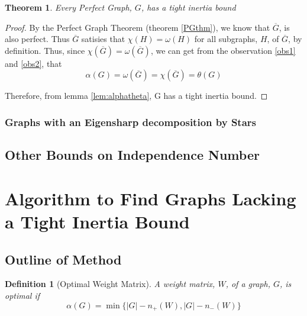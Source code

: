 \documentclass[12pt]{article}
\theoremstyle{parenbold}
\newtheorem{definition}{Definition}[section]
\newtheorem{theorem}{Theorem}[section]
\begin{document}
\begin{theorem}
Every Perfect Graph, $G$, has a tight inertia bound
\end{theorem}

\begin{proof}
By the Perfect Graph Theorem (theorem \ref{PGthm}), we know that $\overline{G}$, is also perfect. Thus $\overline{G}$ satisies that $\chi(H) = \omega(H)$ for all subgraphs, $H$, of $\overline{G}$, by definition.
Thus, since $\chi(\overline{G}) = \omega(\overline{G})$, we can get from the observation \ref{obs1} and \ref{obs2}, that
\begin{equation}
\alpha(G) = \omega(\overline{G}) = \chi(\overline{G}) = \theta(G)
\end{equation}

Therefore, from lemma \ref{lem:alphatheta}, G has a tight inertia bound.
\end{proof}

\subsubsection{Graphs with an Eigensharp decomposition by Stars}

\subsection{Other Bounds on Independence Number}

\section{Algorithm to Find Graphs Lacking a Tight Inertia Bound}

\subsection{Outline of Method}

\begin{definition}[Optimal Weight Matrix]
A weight matrix, $W$, of a graph, $G$, is optimal if
\begin{equation}
\alpha(G) = \min\{|G| - n_+(W),|G| - n_-(W)\}
\end{equation}
\end{definition}
\end{document}
